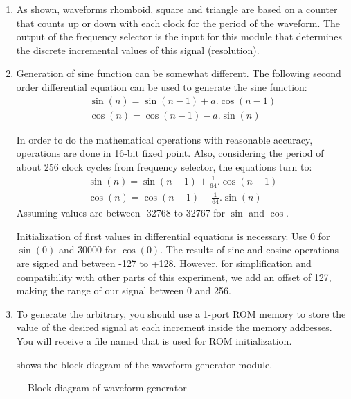 \documentclass[12pt, logo=tehranDLDL/ut]{tehranDLDL}
\begin{document}
\begin{enumerate}
    \item As shown, waveforms rhomboid, square and triangle are based on a counter that counts up or down with each clock for the period of the waveform. The output of the frequency selector is the input for this module that determines the discrete incremental values of this signal (resolution).
    
    \item Generation of sine function can be somewhat different. The following second order differential equation can be used to generate the sine function:
    \begin{gather*}
    \sin(n) = \sin(n-1) + a.\cos(n-1)\\
    \cos(n) = \cos(n-1) - a.\sin(n)
    \end{gather*}
    
    In order to do the mathematical operations with reasonable accuracy, operations are done in 16-bit fixed point. Also, considering the period of about 256 clock cycles from frequency selector, the equations turn to:
    \begin{gather*}
    \sin(n) = \sin(n-1) + \frac{1}{64}.\cos(n-1)\\
    \cos(n) = \cos(n-1) - \frac{1}{64}.\sin(n)
    \end{gather*}
    Assuming values are between -32768 to 32767 for $\sin$ and $\cos$.

    Initialization of first values in differential equations is necessary. Use $0$ for $\sin(0)$ and $30000$ for $\cos(0)$.
    The results of sine and cosine operations are signed and between -127 to +128. However, for simplification and compatibility with other parts of this experiment, we add an offset of 127, making the range of our signal between 0 and 256. 

    \item To generate the arbitrary, you should use a 1-port ROM memory to store the value of the desired signal at each increment inside the memory addresses. You will receive a file named  that is used for ROM initialization. 

     shows the block diagram of the waveform generator module.
\end{enumerate}

\begin{figure}
    \centering
    \caption{Block diagram of waveform generator\label{fig:WGblockdia}}
    \resizebox{0.9\textwidth}{!}{}
\end{figure}
\end{document}

